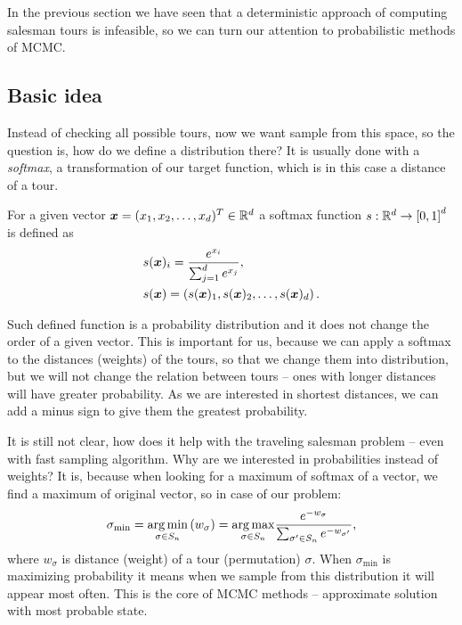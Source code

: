 In the previous section we have seen that a deterministic approach of computing salesman tours is infeasible, so we can turn our attention to probabilistic methods of MCMC. 

\subsection{Basic idea}
	Instead of checking all possible tours, now we want sample from this space, so the question is, how do we define a distribution there? It is usually done with a \textit{softmax}, a transformation of our target function, which is in this case a distance of a tour.
	\begin{definition}
		For a given vector $\bm{x} = (x_1, x_2, \ldots, x_d)^T \in \mathbb{R}^d$ a softmax function $s: \mathbb{R}^d \rightarrow \left[0, 1\right]^d$ is defined as
		\begin{align*}
			&s(\bm{x})_i = \frac{e^{x_i}}{\sum_{j=1}^{d} e^{x_j}}, \\
			&s(\bm{x}) = \left( s(\bm{x})_1, s(\bm{x})_2, \ldots, s(\bm{x})_d \right).
		\end{align*}
	\end{definition}
	Such defined function is a probability distribution and it does not change the order of a given vector. This is important for us, because we can apply a softmax to the distances (weights) of the tours, so that we change them into distribution, but we will not change the relation between tours -- ones with longer distances will have greater probability. As we are interested in shortest distances, we can add a minus sign to give them the greatest probability.
	
	It is still not clear, how does it help with the traveling salesman problem -- even with fast sampling algorithm. Why are we interested in probabilities instead of weights? It is, because when looking for a maximum of softmax of a vector, we find a maximum of original vector, so in case of our problem:
	\begin{equation*}
		\sigma_{\min} = \underset{\sigma \in S_n}{\operatorname*{arg\,min}} \left( w_{\sigma} \right) = \underset{\sigma \in S_n}{\operatorname*{arg\,max}} \frac{e^{-w_{\sigma}}}{\sum_{\sigma' \in S_n} e^{-w_{\sigma'}}},
	\end{equation*}
	where $w_{\sigma}$ is distance (weight) of a tour (permutation) $\sigma$. When $\sigma_{\min}$ is maximizing probability it means when we sample from this distribution it will appear most often. This is the core of MCMC methods -- approximate solution with most probable state. 

